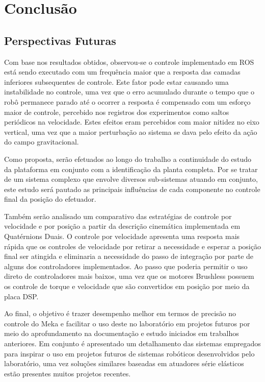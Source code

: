 \chapter{Conclusão} \label{ch:conclusoes}


\section{Perspectivas Futuras}

Com base nos resultados obtidos, observou-se o controle implementado em ROS está sendo executado com um frequência maior que a resposta das camadas inferiores subsequentes de controle. Este fator pode estar causando uma instabilidade no controle, uma vez que o erro acumulado durante o tempo que o robô permanece parado até o ocorrer a resposta é compensado com um esforço maior de controle, percebido nos registros dos experimentos como saltos periódicos na velocidade. Estes efeitos eram percebidos com maior nitidez no eixo vertical, uma vez que a maior perturbação ao sistema se dava pelo efeito da ação do campo gravitacional.

Como proposta, serão efetuados ao longo do trabalho a continuidade do estudo da plataforma em conjunto com a identificação da planta completa. Por se tratar de um sistema complexo que envolve diversos sub-sistemas atuando em conjunto, este estudo será pautado as principais influências de cada componente no controle final da posição do efetuador.

Também serão analisado um comparativo das estratégias de controle por velocidade e por posição a partir da descrição cinemática implementada em Quatérnions Duais. O controle por velocidade apresenta uma resposta mais rápida que os controles de velocidade por retirar a necessidade e esperar a posição final ser atingida e eliminaria a necessidade do passo de integração por parte de alguns dos controladores implementados. Ao passo que poderia permitir o uso direto de controladores mais baixos, uma vez que os motores Brushless possuem os controle de torque e velocidade que são convertidos em posição por meio da placa DSP.

Ao final, o objetivo é trazer desempenho melhor em termos de precisão no controle do Meka e facilitar o uso deste no laboratório em projetos futuros por meio do aprofundamento na documentação e estudo iniciados em trabalhos anteriores. Em conjunto é apresentado um detalhamento das sistemas empregados para inspirar o uso em projetos futuros de sistemas robóticos desenvolvidos pelo laboratório, uma vez soluções similares baseadas em atuadores série elásticos estão presentes muitos projetos recentes.